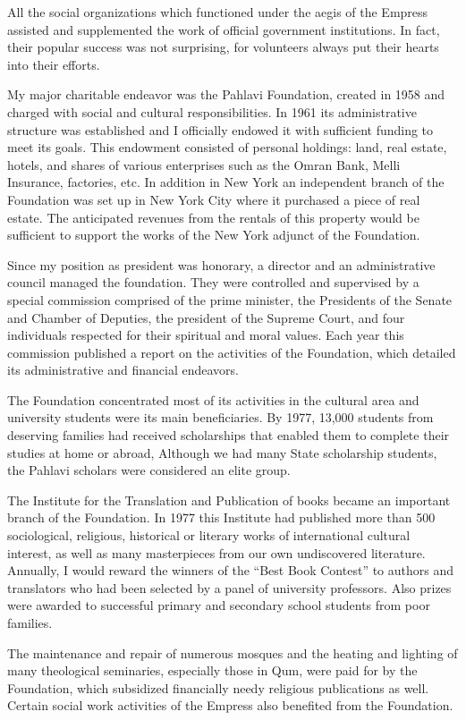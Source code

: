 All the social organizations which functioned under the aegis of the Empress assisted and supplemented the work of official government institutions. In fact, their popular success was not surprising, for volunteers always put their hearts into their efforts. 


My major charitable endeavor was the Pahlavi Foundation, created in 1958 and charged with social and cultural responsibilities. In 1961 its administrative structure was established and I officially endowed it with sufficient funding to meet its goals. This endowment consisted of personal holdings: land, real estate, hotels, and shares of various enterprises such as the Omran Bank, Melli Insurance, factories, etc. In addition in New York an independent branch of the Foundation was set up in New York City where it purchased a piece of real estate. The anticipated revenues from the rentals of this property would be sufficient to support the works of the New York adjunct of the Foundation. 

Since my position as president was honorary, a director and an administrative council managed the foundation. They were controlled and supervised by a special commission comprised of the prime minister, the Presidents of the Senate and Chamber of Deputies, the president of the Supreme Court, and four individuals respected for their spiritual and moral values. Each year this commission published a report on the activities of the Foundation, which detailed its administrative and financial endeavors. 

The Foundation concentrated most of its activities in the cultural area and university students were its main beneficiaries. By 1977, 13,000 students from deserving families had received scholarships that enabled them to complete their studies at home or abroad, Although we had many State scholarship students, the Pahlavi scholars were considered an elite group. 

The Institute for the Translation and Publication of books became an important branch of the Foundation. In 1977 this Institute had published more than 500 sociological, religious, historical or literary works of international cultural interest, as well as many masterpieces from our own undiscovered literature. Annually, I would reward the winners of the “Best Book Contest” to authors and translators who had been selected by a panel of university professors. Also prizes were awarded to successful primary and secondary school students from poor families. 

The maintenance and repair of numerous mosques and the heating and lighting of many theological seminaries, especially those in Qum, were paid for by the Foundation, which subsidized financially needy religious publications as well. Certain social work activities of the Empress also benefited from the Foundation. 

